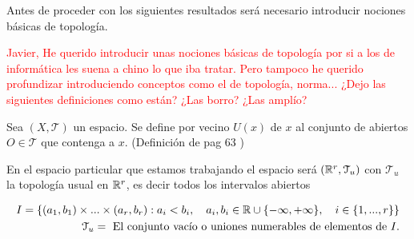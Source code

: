 %


Antes de proceder con los siguientes resultados será necesario introducir nociones
básicas de topología. 

\textcolor{red}{Javier, He querido introducir unas nociones básicas de topología por si 
a los de informática les suena a chino lo que iba tratar. Pero tampoco he querido profundizar
introduciendo conceptos como el de topología, norma... ¿Dejo las siguientes definiciones como están? 
¿Las borro? ¿Las amplío?
}

\begin{definicion}[Vecino]
    Sea $(X, \mathcal{T})$ un espacio. Se define por vecino $U(x)$  de $x$ al conjunto de abiertos 
    $O \in \mathcal{T}$ que contenga a $x$. (Definición de pag 63 \cite{james1966topology})
\end{definicion}

En el espacio particular que estamos trabajando el espacio será $(\mathbb{R}^r, \mathcal{T}_u)$ con 
$\mathcal{T}_u$ la topología usual en $\mathbb{R}^r$,  es decir todos los intervalos abiertos

\begin{equation}
    \begin{split}
            I = \{ (a_1, b_1) \times ... \times (a_r, b_r) : 
            a_i < b_i,
            \quad
            a_i, b_i \in \mathbb{R} \cup \{-\infty,  +\infty \},
            \quad 
            i \in \{1,..., r\}
        \} 
        \\
        \mathcal{T}_u = \text{ El conjunto vacío o uniones numerables de elementos de } I. 
    \end{split}
\end{equation}

